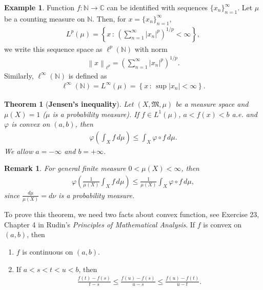 \documentclass[11pt]{book}
\newtheorem{theorem}{Theorem}[chapter]
\newtheorem{remark}{Remark}[chapter]
\theoremstyle{definition}
\newtheorem{example}{Example}[chapter]
\numberwithin{equation}{chapter}
\begin{document}
\medskip

\begin{example}
Function $f: \mathbb{N} \to \mathbb{C}$ can be identified with sequences $\{x_n\}^\infty_{n=1}$. Let $\mu$ be a counting measure on $\mathbb{N}$. Then, for $x = \{x_n\}^\infty_{n=1}$,
\begin{align*}
    L^p(\mu) = \left\{x \,:\, \left(\sum^\infty_{n=1} \left|x_n\right|^p \right)^{1/p} < \infty \right\},
\end{align*}
we write this sequence space as $\ell^p(\mathbb{N})$ with norm
\begin{align*}
    \left\|x\right\|_{\ell^p} = \left(\sum^\infty_{n=1} \left|x_n\right|^p \right)^{1/p}.
\end{align*}
Similarly, $\ell^\infty(\mathbb{N})$ is defined as
\begin{align*}
    \ell^\infty(\mathbb{N}) = L^\infty(\mu) = \left\{x \,:\, \sup \left|x_n\right| < \infty \right\}.
\end{align*}
\end{example}

\medskip

\begin{theorem}[{\bf Jensen's inequality}]
Let $(X,\mathfrak{M},\mu)$ be a measure space and $\mu(X) = 1$ ($\mu$ is a probability measure). If $f \in L^1(\mu)$, $a < f(x) < b$ a.e. and $\varphi$ is convex on $(a,b)$, then 
\begin{align*}
    \varphi \left(\int_X f\,d\mu\right) \leq \int_X \varphi \circ f \,d\mu.
\end{align*}
We allow $a = - \infty$ and $b = + \infty$.
\end{theorem}

\begin{remark}
For general finite measure $0 < \mu(X) < \infty$, then
\begin{align*}
    \varphi \left(\frac{1}{\mu(X)}\int_X f\,d\mu\right) \leq \frac{1}{\mu(X)} \int_X \varphi \circ f \,d\mu,
\end{align*}
since $\frac{d\mu}{\mu(X)} = d\nu$ is a probability measure.
\end{remark}

To prove this theorem, we need two facts about convex function, see Exercise 23, Chapter 4 in Rudin's {\em Principles of Mathematical Analysis}. If $f$ is convex on $(a,b)$, then
\begin{enumerate}[label=(\alph*)]
    \item $f$ is continuous on $(a,b)$.
    
    \item If $a < s < t < u < b$, then
    \begin{align*}
        \frac{f(t) - f(s)}{t - s} \leq \frac{f(u) - f(s)}{u - s} \leq \frac{f(u) - f(t)}{u - t}.
    \end{align*}
\end{enumerate}
\end{document}
